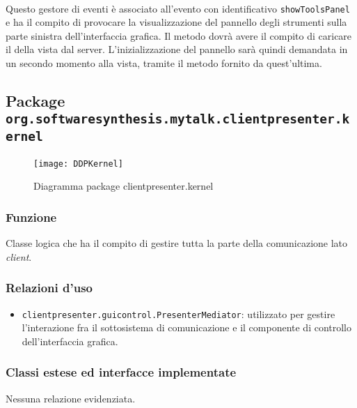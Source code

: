 \begin{description}
  \item{}\\
  Questo gestore di eventi è associato all'evento con identificativo \texttt{showToolsPanel} e ha il compito di provocare la visualizzazione del pannello degli strumenti sulla parte sinistra dell'interfaccia grafica. Il metodo dovrà avere il compito di caricare il  della vista dal server. L'inizializzazione del pannello sarà quindi demandata in un secondo momento alla vista, tramite il metodo  fornito da quest'ultima.

\end{description}


\subsection{Package \texttt{org.softwaresynthesis.mytalk.clientpresenter.kernel}}\label{sec:kernel}

\begin{center}
\begin{figure}[H]
  \texttt{[image: DDPKernel]}
\caption{Diagramma package clientpresenter.kernel}
\end{figure}
\end{center}


\subsubsection*{Funzione}
Classe logica che ha il compito di gestire tutta la parte della comunicazione lato \textit{client}.

\subsubsection*{Relazioni d'uso}
\begin{itemize}
  \item \texttt{clientpresenter.guicontrol.PresenterMediator}: utilizzato per gestire l'interazione fra il sottosistema di comunicazione e il componente di controllo dell'interfaccia grafica.
\end{itemize}

\subsubsection*{Classi estese ed interfacce implementate}
Nessuna relazione evidenziata.

